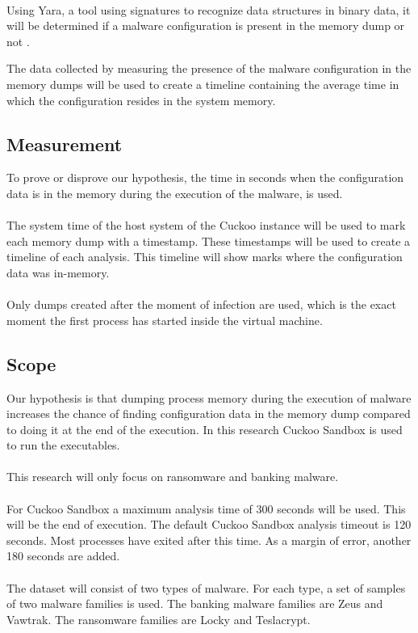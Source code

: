 \documentclass[conference]{IEEEtran}
\begin{document}
\ \\Using Yara, a tool using signatures to recognize data structures in binary  data, it will be determined if a malware configuration is present in the memory dump or not \cite{roberston-ioc}.

The data collected by measuring the presence of the malware configuration in the memory dumps will be used to create a timeline containing the average time in which the configuration resides in the system memory.


\subsection{Measurement}
To prove or disprove our hypothesis, the time in seconds when the \Gls{configuration data} is in the memory during the execution of the malware, is used. \\\\The system time of the host system of the Cuckoo instance will be used to mark each memory dump with a timestamp. These timestamps will be used to create a timeline of each analysis. This timeline will show marks where the \Gls{configuration data} was in-memory.\\\\Only dumps created after the moment of infection are used, which is the exact moment the first process has started inside the virtual machine.


\subsection{Scope}
Our hypothesis is that dumping process memory during the execution of malware increases the chance of finding \Gls{configuration data} in the memory dump compared to doing it at the end of the execution. In this research Cuckoo Sandbox is used to run the executables. \\\\This research will only focus on ransomware and banking malware. \\\\For Cuckoo Sandbox a maximum analysis time of 300 seconds will be used. This will be the end of execution. The default Cuckoo Sandbox analysis timeout is 120 seconds. Most processes have exited after this time. As a margin of error, another 180 seconds are added. \\\\The dataset will consist of two types of malware. For each type, a set of samples of two malware families is used. The banking malware families are Zeus and Vawtrak. The ransomware families are Locky and Teslacrypt.
\end{document}
